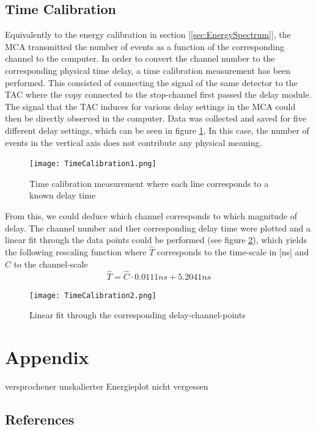 \documentclass[a4paper,parskip,11pt, DIV12]{scrreprt}
\begin{document}
\section{Time Calibration}

		Equivalently to the energy calibration in section [\ref{sec:EnergySpectrum}], the MCA transmitted the number of events as a function of the corresponding channel to the computer. In order to convert the channel number to the corresponding physical time delay, a time calibration measurement has been performed. This consisted of connecting the signal of the same detector to the TAC where the copy connected to the stop-channel first passed the delay module. The signal that the TAC induces for various delay settings in the MCA could then be directly observed in the computer. Data was collected and saved for five different delay settings, which can be seen in figure \ref{fig:TimeCal1}. In this case, the number of events in the vertical axis does not contribute any physical meaning.
		\begin{figure}[H]
\centering
\texttt{[image: TimeCalibration1.png]}
\caption[TimeCalibration1]{Time calibration measurement where each line corresponds to a known delay time}
\label{fig:TimeCal1}
	\end{figure}
	From this, we could deduce which channel corresponds to which magnitude of delay. The channel number and ther corresponding delay time were plotted and a linear fit through the data points could be performed (see figure \ref{fig:TimeCal2}), which yields the following rescaling function where $\hat{T}$ corresponds to the time-scale in [ns] and $\hat{C}$ to the channel-scale
	\begin{equation}
	\hat{T} = \hat{C} \cdot 0.0111ns + 5.2041ns 
	\end{equation}
	\begin{figure}[H]
\centering
\texttt{[image: TimeCalibration2.png]}
\caption[TimeCalibration2]{Linear fit through the corresponding delay-channel-points}
\label{fig:TimeCal2}
	\end{figure}


\chapter{Appendix}

versprochener unskalierter Energieplot nicht vergessen

\section{References}





\end{document}
